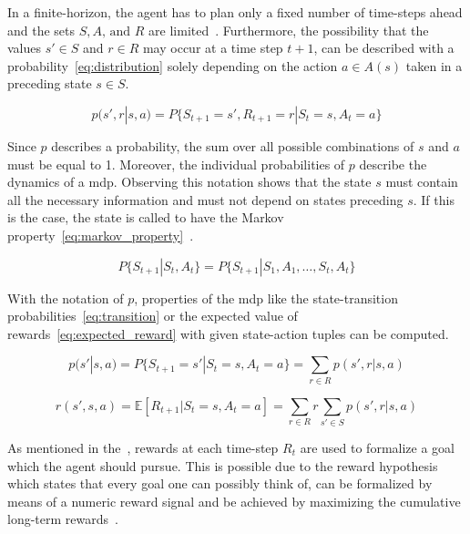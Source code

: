 \documentclass[draft,final]{vutinfth} %
\newcommand{\p}[1]{see p. #1}
\begin{document}
    \footnotetext{\cite[\p{48}]{sutton_reinforcement_2018}}

    In a finite-horizon, the agent has to plan only a fixed number of time-steps ahead and the sets $\mathit{S},\mathit{A}\text{, and }\mathit{R}$ are limited~\citep{kaelbling_reinforcement_1996,sutton_reinforcement_2018}.
    Furthermore, the possibility that the values $s'\in \mathit{S}$ and $r \in \mathit{R}$ may occur at a time step $t+1$, can be described with a probability~\eqref{eq:distribution} solely depending on the action $a \in \mathit{A}(s)$ taken in a preceding state $s \in \mathit{S}$.

    \begin{equation}
        p(s',r|s,a) = P\{S_{t+1}=s', R_{t+1}=r | S_t=s, A_t=a\}\label{eq:distribution}
    \end{equation}

    Since $p$ describes a probability, the sum over all possible combinations of $s$ and $a$ must be equal to 1.
    Moreover, the individual probabilities of $p$ describe the dynamics of a \gls{mdp}.
    Observing this notation shows that the state $s$ must contain all the necessary information and must not depend on states preceding $s$.
    If this is the case, the state is called to have the Markov property~\eqref{eq:markov_property}~\citep{francois-lavet_introduction_2018}.

    \begin{equation}
        P\{S_{t+1}|S_t,A_t\} = P\{S_{t+1}|S_1,A_1,\ldots,S_t,A_t\} \label{eq:markov_property}
    \end{equation}

    With the notation of $p$, properties of the \gls{mdp} like the state-transition probabilities~\eqref{eq:transition} or the expected value of rewards~\eqref{eq:expected_reward} with given state-action tuples can be computed.

    \begin{equation}
        p(s'|s,a) = P\{S_{t+1}=s'| S_t=s, A_t=a\} = \sum_{r \in \mathit{R}} p(s',r | s,a) \label{eq:transition}
    \end{equation}

    \begin{equation}
        r(s',s,a) = \mathbb{E}[R_{t+1} | S_t=s, A_t=a] = \sum_{r\in \mathit{R}} r \sum_{s' \in \mathit{S}} p(s',r | s,a) \label{eq:expected_reward}
    \end{equation}

    As mentioned in the~, rewards at each time-step $R_t$ are used to formalize a goal which the agent should pursue.
    This is possible due to the reward hypothesis which states that every goal one can possibly think of, can be formalized by means of a numeric reward signal and be achieved by maximizing the cumulative long-term rewards~\citep{sutton_reinforcement_2018}.
\end{document}
